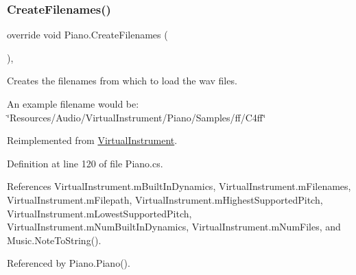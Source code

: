 \subsubsection{\texorpdfstring{Create\+Filenames()}{CreateFilenames()}}
{\footnotesize\ttfamily override void Piano.\+Create\+Filenames (\begin{DoxyParamCaption}{ }\end{DoxyParamCaption})\hspace{0.3cm}{\ttfamily [protected]}, {\ttfamily [virtual]}}



Creates the filenames from which to load the wav files. 

An example filename would be\+: ~\newline
 \char`\"{}\+Resources/\+Audio/\+Virtual\+Instrument/\+Piano/\+Samples/ff/\+C4ff\char`\"{} 

Reimplemented from \hyperlink{group___v_i_base_virt_func_gaacfc9521214176292bfb9665556fb991}{Virtual\+Instrument}.



Definition at line 120 of file Piano.\+cs.



References Virtual\+Instrument.\+m\+Built\+In\+Dynamics, Virtual\+Instrument.\+m\+Filenames, Virtual\+Instrument.\+m\+Filepath, Virtual\+Instrument.\+m\+Highest\+Supported\+Pitch, Virtual\+Instrument.\+m\+Lowest\+Supported\+Pitch, Virtual\+Instrument.\+m\+Num\+Built\+In\+Dynamics, Virtual\+Instrument.\+m\+Num\+Files, and Music.\+Note\+To\+String().



Referenced by Piano.\+Piano().


